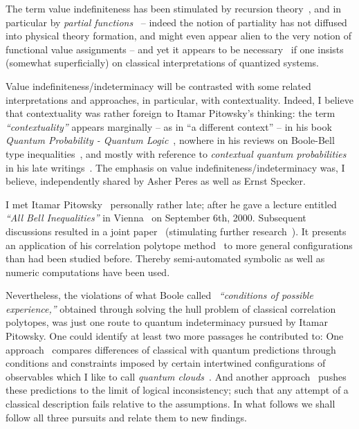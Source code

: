 \documentclass[%
  twocolumn,
 showpacs,
 showkeys,
 preprintnumbers,
 amsmath,amssymb,
 aps,
  pra,
  longbibliography,
 ]{revtex4-1}
\begin{document}
The term value indefiniteness has been stimulated by recursion theory~\citep{rogers1,odi:89,Smullyan1993-SMURTF},
and in particular by {\em partial functions}~\citep{Kleene1936} --
indeed the notion of partiality has not diffused into physical theory formation,
and might even appear alien to the very notion of functional value assignments --
and yet it appears to be necessary~\citep{2012-incomput-proofsCJ,PhysRevA.89.032109,2015-AnalyticKS}
if one insists (somewhat superficially)
on classical interpretations of quantized systems.

Value indefiniteness/indeterminacy will be contrasted with some related interpretations and approaches,
in particular, with contextuality.
Indeed, I believe that contextuality was rather foreign to Itamar Pitowsky's thinking:
the term {\em ``contextuality''} appears marginally --
as in ``a different context'' -- in his book
{\em Quantum Probability - Quantum Logic}~\citep{pitowsky},
nowhere in his reviews on Boole-Bell type inequalities~\citep{pitowsky-89a,Pit-94},
and mostly with reference to {\em contextual quantum probabilities} in his late writings~\citep{pitowsky-06}.
The emphasis on value indefiniteness/indeterminacy was, I believe, independently shared
by Asher Peres as well as Ernst Specker.


I met Itamar Pitowsky~\citep{BUB201085} personally rather late;
after he gave a lecture entitled {\em ``All Bell Inequalities''} in Vienna~\citep{ESI-AR-2000} on September 6th, 2000.
Subsequent discussions resulted in a joint paper~\citep{2000-poly}
(stimulating further research~\citep{sliwa-2003,collins-gisin-2003}).
It presents an application of his correlation polytope method~\citep{pitowsky-86,pitowsky,pitowsky-89a,Pit-91,Pit-94}
to more general configurations than had been studied before.
Thereby semi-automated symbolic as well as numeric computations have been used.

Nevertheless, the violations of what Boole called~\cite[p.~229]{Boole-62} {\em ``conditions of possible experience,''}
obtained through solving the hull problem of classical correlation polytopes, was just one route
to quantum indeterminacy pursued by Itamar Pitowsky.
One could identify at least two more passages he contributed to:
One approach~\citep{Pitowsky2003395,pitowsky-06} compares differences of classical with quantum predictions
through conditions and constraints imposed by certain intertwined configurations of observables which I like to call {\em quantum clouds}~\citep{svozil-2020-c}.
And another approach~\citep{pitowsky:218,hru-pit-2003} pushes these predictions to the limit of logical inconsistency;
such that any attempt of a classical description fails relative to the assumptions.
In what follows we shall follow all three pursuits and relate them to new findings.
\end{document}
